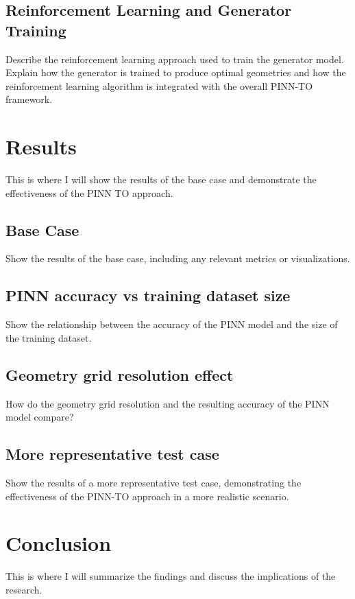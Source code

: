 \documentclass[a4paper,fleqn]{cas-dc}
\begin{document}
\subsection{Reinforcement Learning and Generator Training}

Describe the reinforcement learning approach used to train the generator model. Explain how the generator is trained to produce optimal geometries and how the reinforcement learning algorithm is integrated with the overall PINN-TO framework.

\section{Results}\label{sec:results}

This is where I will show the results of the base case and demonstrate the effectiveness of the PINN TO approach.

\subsection{Base Case}

Show the results of the base case, including any relevant metrics or visualizations.

\subsection{PINN accuracy vs training dataset size}

Show the relationship between the accuracy of the PINN model and the size of the training dataset.

\subsection{Geometry grid resolution effect}

How do the geometry grid resolution and the resulting accuracy of the PINN model compare?

\subsection{More representative test case}

Show the results of a more representative test case, demonstrating the effectiveness of the PINN-TO approach in a more realistic scenario.

\section{Conclusion}\label{sec:Conclusion}

This is where I will summarize the findings and discuss the implications of the research.

\printcredits

%





\end{document}
